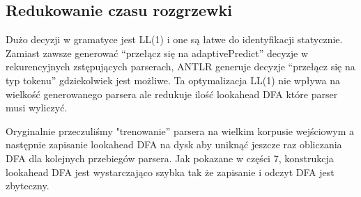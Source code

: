 ﻿\subsection{Redukowanie czasu rozgrzewki}
Dużo decyzji w gramatyce jest LL(1) i one są łatwe do identyfikacji
statycznie. Zamiast zawsze generować “przełącz się na
adaptivePredict” decyzje w rekurencyjnych zstępujących parserach,
ANTLR generuje decyzje “przełącz się na typ tokenu” gdziekolwiek
jest możliwe. Ta optymalizacja LL(1) nie wpływa na wielkość
generowanego parsera ale redukuje ilość lookahead DFA
które parser musi wyliczyć.
\par
Oryginalnie przeczuliśmy "trenowanie” parsera na wielkim
korpusie wejściowym a następnie zapisanie lookahead DFA na dysk
aby uniknąć jeszcze raz obliczania DFA dla kolejnych przebiegów parsera.
Jak pokazane w części 7, konstrukcja lookahead DFA jest wystarczająco szybka
tak że zapisanie i odczyt DFA jest zbyteczny.

